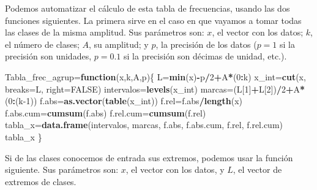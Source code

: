 \documentclass[
]{book}
\newenvironment{Shaded}{\begin{snugshade}}{\end{snugshade}}
\newcommand{\ControlFlowTok}[1]{\textcolor[rgb]{0.13,0.29,0.53}{\textbf{#1}}}
\newcommand{\DataTypeTok}[1]{\textcolor[rgb]{0.13,0.29,0.53}{#1}}
\newcommand{\DecValTok}[1]{\textcolor[rgb]{0.00,0.00,0.81}{#1}}
\newcommand{\KeywordTok}[1]{\textcolor[rgb]{0.13,0.29,0.53}{\textbf{#1}}}
\newcommand{\NormalTok}[1]{#1}
\newcommand{\OperatorTok}[1]{\textcolor[rgb]{0.81,0.36,0.00}{\textbf{#1}}}
\newcommand{\OtherTok}[1]{\textcolor[rgb]{0.56,0.35,0.01}{#1}}
\theoremstyle{definition}
\theoremstyle{definition}
\theoremstyle{definition}
\theoremstyle{remark}
\begin{document}
Podemos automatizar el cálculo de esta tabla de frecuencias, usando las dos funciones siguientes.
La primera sirve en el caso en que vayamos a tomar todas las clases de la misma amplitud.
Sus parámetros son: \(x\), el vector con los datos; \(k\), el número de clases; \(A\), su amplitud; y \(p\), la precisión de los datos (\(p=1\) si la precisión son unidades, \(p=0.1\) si la precisión son décimas de unidad, etc.).

\begin{Shaded}
\begin{Highlighting}[]
\NormalTok{Tabla\_frec\_agrup=}\ControlFlowTok{function}\NormalTok{(x,k,A,p)\{}
\NormalTok{    L=}\KeywordTok{min}\NormalTok{(x)}\OperatorTok{{-}}\NormalTok{p}\OperatorTok{/}\DecValTok{2}\OperatorTok{+}\NormalTok{A}\OperatorTok{*}\NormalTok{(}\DecValTok{0}\OperatorTok{:}\NormalTok{k)}
\NormalTok{    x\_int=}\KeywordTok{cut}\NormalTok{(x, }\DataTypeTok{breaks=}\NormalTok{L, }\DataTypeTok{right=}\OtherTok{FALSE}\NormalTok{)}
\NormalTok{    intervalos=}\KeywordTok{levels}\NormalTok{(x\_int)}
\NormalTok{    marcas=(L[}\DecValTok{1}\NormalTok{]}\OperatorTok{+}\NormalTok{L[}\DecValTok{2}\NormalTok{])}\OperatorTok{/}\DecValTok{2}\OperatorTok{+}\NormalTok{A}\OperatorTok{*}\NormalTok{(}\DecValTok{0}\OperatorTok{:}\NormalTok{(k}\DecValTok{{-}1}\NormalTok{))}
\NormalTok{    f.abs=}\KeywordTok{as.vector}\NormalTok{(}\KeywordTok{table}\NormalTok{(x\_int))}
\NormalTok{    f.rel=f.abs}\OperatorTok{/}\KeywordTok{length}\NormalTok{(x)}
\NormalTok{    f.abs.cum=}\KeywordTok{cumsum}\NormalTok{(f.abs)}
\NormalTok{    f.rel.cum=}\KeywordTok{cumsum}\NormalTok{(f.rel)}
\NormalTok{    tabla\_x=}\KeywordTok{data.frame}\NormalTok{(intervalos, marcas, f.abs, f.abs.cum, f.rel, f.rel.cum)}
\NormalTok{    tabla\_x}
\NormalTok{  \}}
\end{Highlighting}
\end{Shaded}

Si de las clases conocemos de entrada sus extremos, podemos usar la función siguiente.
Sus parámetros son: \(x\), el vector con los datos, y \(L\), el vector de extremos de clases.
\end{document}
